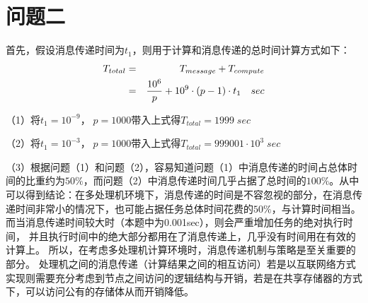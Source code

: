 \documentclass[12pt]{article}
\begin{document}
\section{问题二}

	首先，假设消息传递时间为$t_1$，则用于计算和消息传递的总时间计算方式如下：
\begin{eqnarray}
	T_{total}&=&T_{message}+T_{compute}\\ \notag
	&=&
	\frac{10^{6}}{p}+10^{9}\cdot(p-1)\cdot t_1 \quad sec
\end{eqnarray}

	（1）将$t_1=10^{-9}，\;p=1000$带入上式得$T_{total}=1999\;sec$
	
	（2）将$t_1=10^{-3}，\;p=1000$带入上式得$T_{total}=999001\cdot10^{3}\;sec$
	
	（3）根据问题（1）和问题（2），容易知道问题（1）中消息传递的时间占总体时间的比重约为$
	50\%$，而问题（2）中消息传递时间几乎占据了总时间的$100\%$。从中可以得到结论：在多处理机环境下，消息传递的时间是不容忽视的部分，在消息传递时间非常小的情况下，也可能占据任务总体时间花费的$50\%$，与计算时间相当。而当消息传递时间较大时（本题中为0.001sec），则会严重增加任务的绝对执行时间，
	并且执行时间中的绝大部分都用在了消息传递上，几乎没有时间用在有效的计算上。
	所以，在考虑多处理机计算环境时，消息传递机制与策略是至关重要的部分。
	处理机之间的消息传递（计算结果之间的相互访问）若是以互联网络方式实现则需要充分考虑到节点之间访问的逻辑结构与开销，若是在共享存储器的方式下，可以访问公有的存储体从而开销降低。
\end{document}
